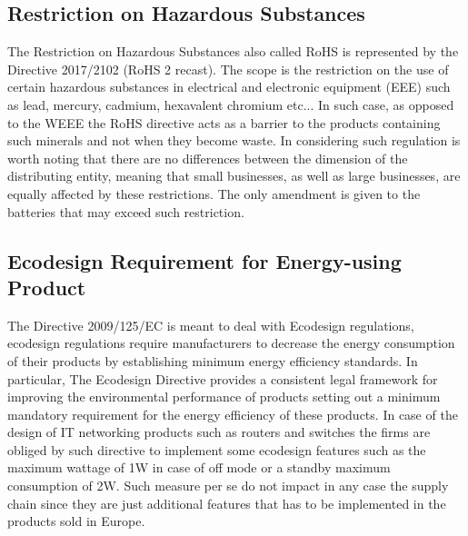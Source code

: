 \documentclass{article}
\begin{document}
\subsection{Restriction on Hazardous Substances}
  The Restriction on Hazardous Substances also called RoHS is represented by the Directive 2017/2102 (RoHS 2 recast). The scope is the restriction on the use of certain hazardous substances in electrical and electronic equipment (EEE) such as lead, mercury, cadmium, hexavalent chromium etc... In such case, as opposed to the WEEE the RoHS directive acts as a barrier to the products containing such minerals and not when they become waste. In considering such regulation is worth noting that there are no differences between the dimension of the distributing entity, meaning that small businesses, as well as large businesses, are equally affected by these restrictions. The only amendment is given to the batteries that may exceed such restriction.

\subsection{Ecodesign Requirement for Energy-using Product}
  The Directive 2009/125/EC is meant to deal with Ecodesign regulations, ecodesign regulations require manufacturers to decrease the energy consumption of their products by establishing minimum energy efficiency standards. In particular, The Ecodesign Directive provides a consistent legal framework for improving the environmental performance of products setting out a minimum mandatory requirement for the energy efficiency of these products. In case of the design of IT networking products such as routers and switches the firms are obliged by such directive to implement some ecodesign features such as the maximum wattage of 1W in case of off mode or a standby maximum consumption of 2W. Such measure per se do not impact in any case the supply chain since they are just additional features that has to be implemented in the products sold in Europe.
\end{document}
